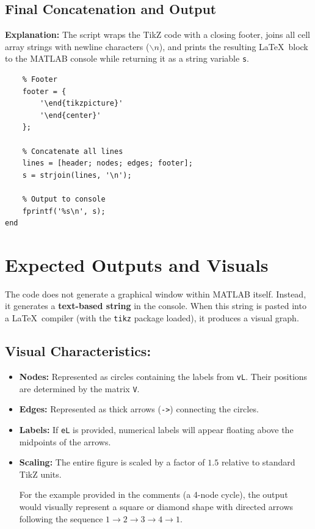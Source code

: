 \subsection{Final Concatenation and Output}
\textbf{Explanation:} The script wraps the TikZ code with a closing footer, joins all cell array strings with newline characters ($\backslash n$), and prints the resulting \LaTeX\ block to the MATLAB console while returning it as a string variable \texttt{s}.
\begin{lstlisting}
    % Footer
    footer = {
        '\end{tikzpicture}'
        '\end{center}'
    };

    % Concatenate all lines
    lines = [header; nodes; edges; footer];
    s = strjoin(lines, '\n');

    % Output to console
    fprintf('%s\n', s);
end
\end{lstlisting}

\section{Expected Outputs and Visuals}
The code does not generate a graphical window within MATLAB itself. Instead, it generates a \textbf{text-based string} in the console. When this string is pasted into a \LaTeX\ compiler (with the \texttt{tikz} package loaded), it produces a visual graph.

\subsection*{Visual Characteristics:}
\begin{itemize}
    \item \textbf{Nodes:} Represented as circles containing the labels from \texttt{vL}. Their positions are determined by the matrix \texttt{V}.
    \item \textbf{Edges:} Represented as thick arrows (\texttt{->}) connecting the circles.
    \item \textbf{Labels:} If \texttt{eL} is provided, numerical labels will appear floating above the midpoints of the arrows.
    \item \textbf{Scaling:} The entire figure is scaled by a factor of $1.5$ relative to standard TikZ units.


For the example provided in the comments (a 4-node cycle), the output would visually represent a square or diamond shape with directed arrows following the sequence $1 \to 2 \to 3 \to 4 \to 1$.
\end{itemize}